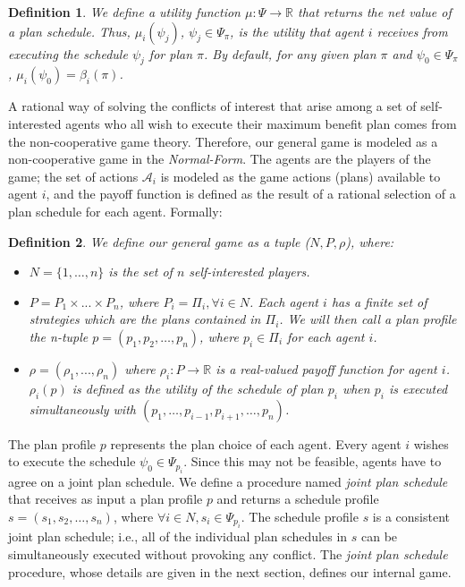 \documentclass[letterpaper]{article}
\newcommand{\A}{{\mathcal A}}
\newtheorem{definition}{Definition}
\begin{document}
\begin{definition} We define a utility function $\mu: \Psi \rightarrow \mathbb{R}$ that returns the net value of a plan schedule. Thus, $\mu_i (\psi_j)$, $\psi_j \in \Psi_{\pi}$, is the utility that agent $i$ receives from executing the schedule $\psi_j$ for plan $\pi$. By default, for any given plan $\pi$ and $\psi_0 \in \Psi_{\pi}$, $\mu_i (\psi_0) = \beta_i(\pi)$.
\end{definition}

A rational way of solving the conflicts of interest that arise among a set of self-interested agents who all wish to execute their maximum benefit plan comes from the non-cooperative game theory. Therefore, our general game is modeled as a non-cooperative game in the \emph{Normal-Form}. The agents are the players of the game; the set of actions $\A_i$ is modeled as the game actions (plans) available to agent $i$, and the payoff function is defined as the result of a rational selection of a plan schedule for each agent. Formally:

\begin{definition} We define our general game as a tuple ($N, P, \rho$), where:
\begin{itemize}
	\item $N=\{1, \ldots, n\}$ is the set of $n$ self-interested players.
	\item $P=P_1 \times ... \times P_n$, where $P_i=\Pi_i, \forall i \in N$. Each agent $i$ has a finite set of strategies which are the plans contained in $\Pi_i$. We will then call a \emph{plan profile} the n-tuple $p=(p_1, p_2, \ldots, p_n)$, where $ p_i \in \Pi_i$ for each agent $i$.
	\item $\rho=(\rho_1,...,\rho_n)$ where $\rho_i: P \rightarrow \mathbb{R}$ is a real-valued payoff function for agent $i$. $\rho_i(p)$ is defined as the utility of the schedule of plan $p_i$ when $p_i$ is executed simultaneously with $(p_1, \ldots, p_{i-1}, p_{i+1}, \ldots, p_n)$.
\end{itemize}
\end{definition}

The plan profile $p$ represents the plan choice of each agent. Every agent $i$ wishes to execute the schedule $\psi_0 \in \Psi_{p_i}$. Since this may not be feasible, agents have to agree on a joint plan schedule. We define a procedure named \emph{joint plan schedule} that receives as input a plan profile $p$ and returns a schedule profile $s=(s_1, s_2, \ldots, s_n)$, where $\forall i \in N, s_i \in \Psi_{p_i}$. The schedule profile $s$ is a consistent joint plan schedule; i.e., all of the individual plan schedules in $s$ can be simultaneously executed without provoking any conflict. The \emph{joint plan schedule} procedure, whose details are given in the next section, defines our internal game.
\end{document}
